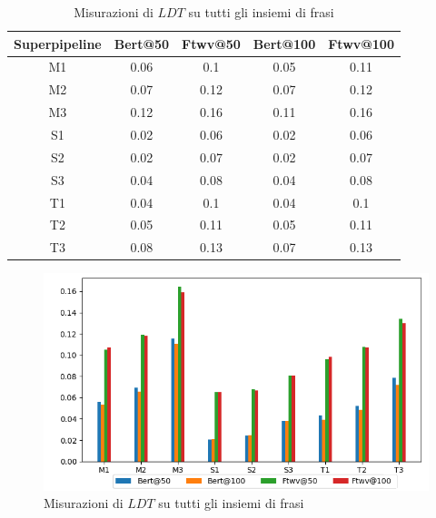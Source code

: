 \begin{table}[H]
\centering
\begin{tabular}{c|cc|cc}
\textbf{Superpipeline} & \textbf{Bert@50} &  \textbf{Ftwv@50} & \textbf{Bert@100} & \textbf{Ftwv@100}\\
\hline
M1& 0.06& 0.1& 0.05& 0.11\\
M2& 0.07& 0.12& 0.07& 0.12\\
M3& 0.12& 0.16& 0.11& 0.16\\
S1& 0.02& 0.06& 0.02& 0.06\\
S2& 0.02& 0.07& 0.02& 0.07\\
S3& 0.04& 0.08& 0.04& 0.08\\
T1& 0.04& 0.1& 0.04& 0.1\\
T2& 0.05& 0.11& 0.05& 0.11\\
T3& 0.08& 0.13& 0.07& 0.13\\
\end{tabular}
\caption{Misurazioni di $LDT$ su tutti gli insiemi di frasi}
\label{fig:test_res_ldt_gra}
\end{table}

\begin{figure}[H]
\centering
\includegraphics[width=\textwidth]{immagini/test/ldt}
\caption{Misurazioni di $LDT$ su tutti gli insiemi di frasi}
\label{fig:test_res_ldt}
\end{figure}

\newpage

